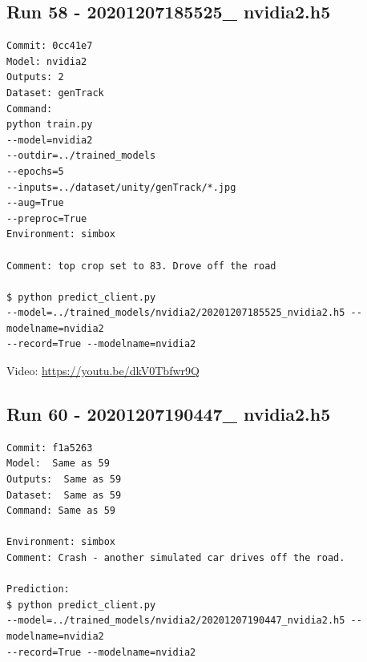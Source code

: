 \subsection{Run 58 - 20201207185525\_ nvidia2.h5}
\label{app_res:58}
\begin{verbatim}
Commit: 0cc41e7
Model: nvidia2
Outputs: 2
Dataset: genTrack   
Command:
python train.py 
--model=nvidia2
--outdir=../trained_models
--epochs=5
--inputs=../dataset/unity/genTrack/*.jpg
--aug=True
--preproc=True
Environment: simbox

Comment: top crop set to 83. Drove off the road

$ python predict_client.py 
--model=../trained_models/nvidia2/20201207185525_nvidia2.h5 --modelname=nvidia2
--record=True --modelname=nvidia2

\end{verbatim}
Video: \url{https://youtu.be/dkV0Tbfwr9Q}

\subsection{Run 60 - 20201207190447\_ nvidia2.h5}
\label{app_res:60}
\begin{verbatim}
Commit: f1a5263
Model:  Same as 59
Outputs:  Same as 59
Dataset:  Same as 59
Command: Same as 59

Environment: simbox
Comment: Crash - another simulated car drives off the road.

Prediction:
$ python predict_client.py 
--model=../trained_models/nvidia2/20201207190447_nvidia2.h5 --modelname=nvidia2 
--record=True --modelname=nvidia2
\end{verbatim}


